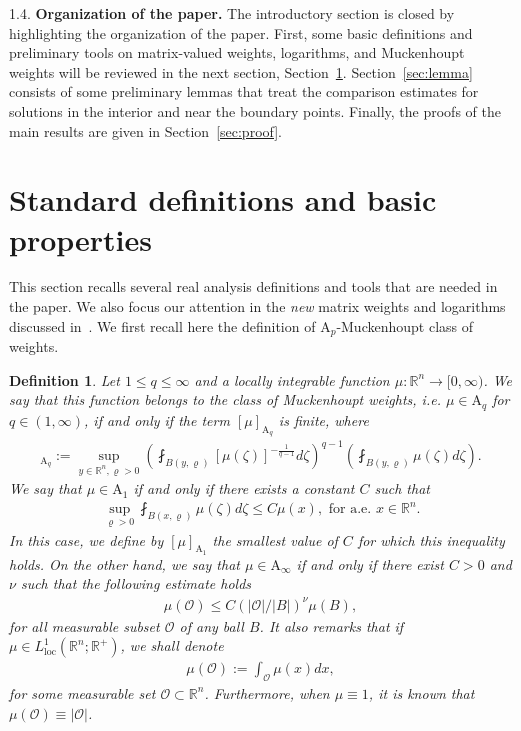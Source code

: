 \documentclass[a4paper, 11pt]{article}
\newtheorem{definition}[theorem]{Definition}
\begin{document}
1.4. \textbf{Organization of the paper.} The introductory section is closed by highlighting the organization of the paper. First, some basic definitions and preliminary tools on matrix-valued weights, logarithms, and Muckenhoupt weights will be reviewed in the next section, Section~\ref{sec:pre}. Section~\ref{sec:lemma} consists of some preliminary lemmas that treat the comparison estimates for solutions in the interior and near the boundary points. Finally, the proofs of the main results are given in Section~\ref{sec:proof}. 

\section{Standard definitions and basic properties}
\label{sec:pre}
This section recalls several real analysis definitions and tools that are needed in the paper. We also focus our attention in the \emph{new} matrix weights and logarithms discussed in~\cite{BDGN2022, BBDL2023}. We first recall here the definition of $\mathrm{A}_p$-Muckenhoupt class of weights. 

\begin{definition}
Let $1 \le q \le \infty$ and a locally integrable function $\mu: \mathbb{R}^n \to [0,\infty)$. We say that this function belongs to the class of Muckenhoupt weights, i.e. $\mu \in \mathrm{A}_{q}$ for $q \in (1,\infty)$, if and only if the term $[\mu]_{\mathrm{A}_{q}}$ is finite, where
\begin{align*}
[\mu]_{\mathrm{A}_{q}} := \displaystyle \sup_{y \in \mathbb{R}^n, \varrho>0} \left(\fint_{B(y,\varrho)} [\mu(\zeta)]^{-\frac{1}{q-1}} d\zeta\right)^{q-1} \left(\fint_{B(y,\varrho)} \mu(\zeta) d\zeta\right).
\end{align*}
We say that $\mu \in \mathrm{A}_{1}$ if and only if there exists a constant $C$ such that
\begin{align*}
\sup_{\varrho>0} \fint_{B(x,\varrho)} \mu(\zeta) d\zeta \le C \mu(x), \mbox{ for a.e. } x \in \mathbb{R}^n.
\end{align*}
In this case, we define by $[\mu]_{\mathrm{A}_{1}}$ the smallest value of $C$ for which this inequality holds. On the other hand, we say that $\mu \in \mathrm{A}_{\infty}$ if and only if there exist  $C>0$ and $\nu$ such that the following estimate holds
\begin{align*}
\mu(\mathcal{O}) \le C \left({|\mathcal{O}|}/{|B|}\right)^\nu \mu(B),
\end{align*}
for all measurable subset $\mathcal{O}$ of any ball $B$. It also remarks that if $\mu \in L^1_{\mathrm{loc}}(\mathbb{R}^n;\mathbb{R}^+)$, we shall denote
\begin{align*}
\mu(\mathcal{O}) :=\int_{\mathcal{O}}\mu(x)dx,
\end{align*}
for some measurable set $\mathcal{O} \subset \mathbb{R}^n$. Furthermore, when $\mu \equiv 1$, it is known that $\mu(\mathcal{O}) \equiv |\mathcal{O}|$.
\end{definition}
\end{document}
